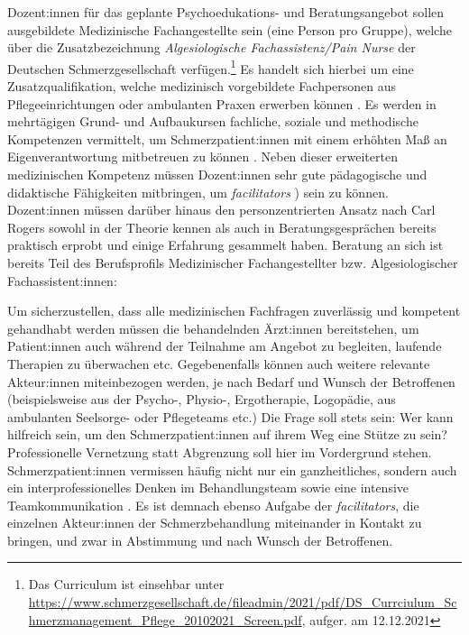 \documentclass[
  twoside,
  parskip=half-,
]{scrreprt}
\begin{document}
\begin{praxis}
  Dozent:innen für das geplante Psychoedukations- und Beratungsangebot sollen ausgebildete Medizinische Fachangestellte sein (eine Person pro Gruppe), welche über die Zusatzbezeichnung \textit{Algesiologische Fachassistenz/Pain Nurse} der Deutschen Schmerzgesellschaft verfügen.\footnote{Das Curriculum ist einsehbar unter \url{https://www.schmerzgesellschaft.de/fileadmin/2021/pdf/DS_Currciulum_Schmerzmanagement_Pflege_20102021_Screen.pdf}, aufger. am 12.12.2021} Es handelt sich hierbei um eine Zusatzqualifikation, welche medizinisch vorgebildete Fachpersonen aus Pflegeeinrichtungen oder ambulanten Praxen erwerben können \autocite[vgl.][193]{nobisHerausforderung}. Es werden in mehrtägigen Grund- und Aufbaukursen fachliche, soziale und methodische Kompetenzen vermittelt, um Schmerzpatient:innen mit einem erhöhten Maß an Eigenverantwortung mitbetreuen zu können \autocite[vgl.][193]{nobisHerausforderung}. Neben dieser erweiterten medizinischen Kompetenz müssen Dozent:innen sehr gute pädagogische und didaktische Fähigkeiten mitbringen, um \textit{facilitators} \autocite[110]{rogersLernenFreiheit}) sein zu können. Dozent:innen müssen darüber hinaus den personzentrierten Ansatz nach Carl Rogers sowohl in der Theorie kennen als auch in Beratungsgesprächen bereits praktisch erprobt und einige Erfahrung gesammelt haben. Beratung an sich ist bereits Teil des Berufsprofils Medizinischer Fachangestellter bzw. Algesiologischer Fachassistent:innen: 

  Um sicherzustellen, dass alle medizinischen Fachfragen zuverlässig und kompetent gehandhabt werden müssen die behandelnden Ärzt:innen bereitstehen, um Patient:innen auch während der Teilnahme am Angebot zu begleiten, laufende Therapien zu überwachen etc.  Gegebenenfalls können auch weitere relevante Akteur:innen miteinbezogen werden, je nach Bedarf und Wunsch der Betroffenen (beispielsweise aus der Psycho-, Physio-, Ergotherapie, Logopädie, aus ambulanten Seelsorge- oder Pflegeteams etc.) Die Frage soll stets sein: Wer kann hilfreich sein, um den Schmerzpatient:innen auf ihrem Weg eine Stütze zu sein? Professionelle Vernetzung statt Abgrenzung soll hier im Vordergrund stehen. Schmerzpatient:innen vermissen häufig nicht nur ein ganzheitliches, sondern auch ein interprofessionelles Denken im Behandlungsteam sowie eine intensive Teamkommunikation \autocite[vgl.][338]{HeftSchmerz5}. Es ist demnach ebenso Aufgabe der \textit{facilitators}, die einzelnen Akteur:innen der Schmerzbehandlung miteinander in Kontakt zu bringen, und zwar in Abstimmung und nach Wunsch der Betroffenen.
\end{praxis}
\end{document}
